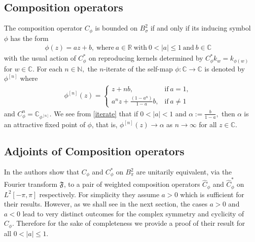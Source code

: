 \documentclass[11pt]{amsart}%
\numberwithin{equation}{section}
\theoremstyle{plain}
\theoremstyle{definition}
\theoremstyle{definition}
\newcommand {\C} {\mathbb C}
\begin{document}
\subsection{Composition operators}
The composition operator $C_{\phi}$ is bounded on $B^2_{\sigma}$ if and only if  its inducing symbol $\phi$ has the form 
\begin{align}\label{symbol}
\phi(z)=az+b,\ \text{where} \ a\in \mathbb{R} \ \text{with} \ 0<|a|\leq 1 \ \text{and} \ b\in \mathbb{C}
\end{align}	
with the usual action of $C_{\phi}^*$ on reproducing kernels determined by $C_{\phi}^*k_w=k_{\phi(w)}$ for $w\in \mathbb{C}.$ For each $n\in \mathbb{N},$ the $n$-iterate of the self-map $\phi:\mathbb{C}\rightarrow \mathbb{C}$ is denoted by $\phi^{[n]}$ where
\begin{align}\label{iterate}
\phi^{[n]}(z)= \begin{cases}z+n b, & \text{if} \ a=1, \\ 
a^{n} z+\frac{\left(1-a^{n}\right)}{1-a}b,  & \text{if} \ a \neq 1 
\end{cases}
\end{align}	
and $C_{\phi}^n=\C_{\phi^{[n]}}.$ We see from \eqref{iterate} that if $0<|a|<1$ and $\alpha:=\frac{b}{1-a},$ then $\alpha$ is an attractive fixed point of $\phi$, that is,  $\phi^{[n]}(z)\rightarrow \alpha$ as $n\rightarrow \infty$ for all $z\in \mathbb{C}.$ 








\subsection{Adjoints of Composition operators} In \cite{chacon2007composition} the authors show that $C_\phi$ and $C_\phi^*$ on $B^2_\pi$ are unitarily equivalent, via the Fourier transform $\mathfrak{F}$, to a pair of weighted composition operators $\widehat{C}_{\phi}$ and $\widehat{C}_{\phi}^*$ on $L^2[-\pi,\pi]$ respectively. For simplicity they assume $a>0$ which is sufficient for their results. However, as we shall see in the next section, the cases $a>0$ and $a<0$ lead to very distinct outcomes for the complex symmetry and cyclicity of $C_\phi$. Therefore for the sake of completeness we provide a proof of their result for all $0<|a|\leq 1$.
\end{document}
